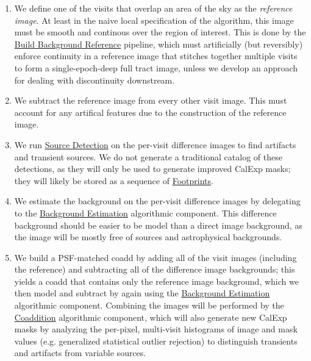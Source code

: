 \begin{enumerate}
\item We define one of the visits that overlap an area of the sky as the \emph{reference image}.  At least in the naive local specification of the algorithm, this image must be smooth and continous over the region of interest.  This is done by the \hyperref[sec:acBuildBackgroundReference]{Build Background Reference} pipeline, which must artificially (but reversibly) enforce continuity in a reference image that stitches together multiple visits to form a single-epoch-deep full tract image, unless we develop an approach for dealing with discontinuity downstream.
\item We subtract the reference image from every other visit image.  This must account for any artifical features due to the construction of the reference image.
\item We run \hyperref[sec:acSourceDetection]{Source Detection} on the per-visit difference images to find artifacts and transient sources.  We do not generate a traditional catalog of these detections, as they will only be used to generate improved CalExp masks; they will likely be stored as a sequence of \hyperref[sec:spFootprints]{Footprints}.
\item We estimate the background on the per-visit difference images by delegating to the \hyperref[sec:acBackgroundEstimation]{Background Estimation} algorithmic component.  This difference background should be easier to be model than a direct image background, as the image will be mostly free of sources and astrophysical backgrounds.
\item We build a PSF-matched coadd by adding all of the visit images (including the reference) and subtracting all of the difference image backgrounds; this yields a coadd that contains only the reference image background, which we then model and subtract by again using the \hyperref[sec:acBackgroundEstimation]{Background Estimation} algorithmic component.  Combining the images will be performed by the \hyperref[sec:acCoaddition]{Coaddition} algorithmic component, which will also generate new CalExp masks by analyzing the per-pixel, multi-visit histograms of image and mask values (e.g. generalized statistical outlier rejection) to distinguish transients and artifacts from variable sources.
\end{enumerate}

